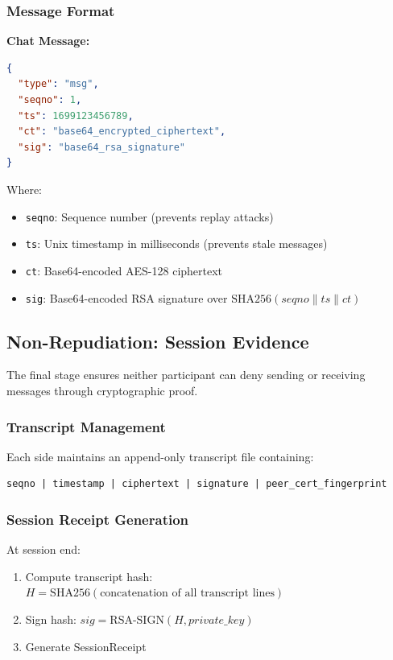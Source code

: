 \documentclass[runningheads]{llncs}
\begin{document}
\subsubsection{Message Format}

\textbf{Chat Message:}
\begin{lstlisting}[language=json]
{
  "type": "msg",
  "seqno": 1,
  "ts": 1699123456789,
  "ct": "base64_encrypted_ciphertext",
  "sig": "base64_rsa_signature"
}
\end{lstlisting}

Where:
\begin{itemize}
    \item \texttt{seqno}: Sequence number (prevents replay attacks)
    \item \texttt{ts}: Unix timestamp in milliseconds (prevents stale messages)
    \item \texttt{ct}: Base64-encoded AES-128 ciphertext
    \item \texttt{sig}: Base64-encoded RSA signature over $\text{SHA256}(seqno \| ts \| ct)$
\end{itemize}

\subsection{Non-Repudiation: Session Evidence}

The final stage ensures neither participant can deny sending or receiving messages through cryptographic proof.

\subsubsection{Transcript Management}

Each side maintains an append-only transcript file containing:
\begin{lstlisting}
seqno | timestamp | ciphertext | signature | peer_cert_fingerprint
\end{lstlisting}

\subsubsection{Session Receipt Generation}

At session end:
\begin{enumerate}
    \item Compute transcript hash: $H = \text{SHA256}(\text{concatenation of all transcript lines})$
    \item Sign hash: $sig = \text{RSA-SIGN}(H, private\_key)$
    \item Generate SessionReceipt
\end{enumerate}
\end{document}
